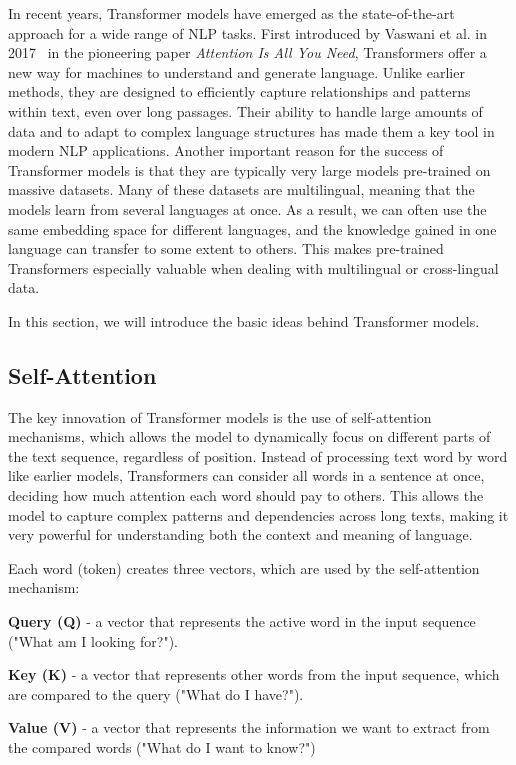 \documentclass[twoside]{ctuthesis}
\theoremstyle{plain}
\theoremstyle{definition}
\theoremstyle{note}
\begin{document}
In recent years, Transformer models have emerged as the state-of-the-art approach for a wide range of NLP tasks. First introduced by Vaswani et al. in 2017~\cite{Vaswani2017} in the pioneering paper \textit{Attention Is All You Need}, Transformers offer a new way for machines to understand and generate language. Unlike earlier methods, they are designed to efficiently capture relationships and patterns within text, even over long passages. Their ability to handle large amounts of data and to adapt to complex language structures has made them a key tool in modern NLP applications.
Another important reason for the success of Transformer models is that they are typically very large models pre-trained on massive datasets. Many of these datasets are multilingual, meaning that the models learn from several languages at once. As a result, we can often use the same embedding space for different languages, and the knowledge gained in one language can transfer to some extent to others. This makes pre-trained Transformers especially valuable when dealing with multilingual or cross-lingual data.\par
In this section, we will introduce the basic ideas behind Transformer models.\par

\subsection{Self-Attention}

The key innovation of Transformer models is the use of self-attention mechanisms, which allows the model to dynamically focus on different parts of the text sequence, regardless of position. Instead of processing text word by word like earlier models, Transformers can consider all words in a sentence at once, deciding how much attention each word should pay to others. This allows the model to capture complex patterns and dependencies across long texts, making it very powerful for understanding both the context and meaning of language.\par

Each word (token) creates three vectors, which are used by the self-attention mechanism\cite{Vaswani2017}:
\begin{list}{}{}
  \itemsep=0pt
  \item \textbf{Query (Q)} - a vector that represents the active word in the input sequence ("What am I looking for?").
  \item \textbf{Key (K)} - a vector that represents other words from the input sequence, which are compared to the query ("What do I have?").
  \item \textbf{Value (V)} - a vector that represents the information we want to extract from the compared words ("What do I want to know?")
\end{list}
\end{document}
